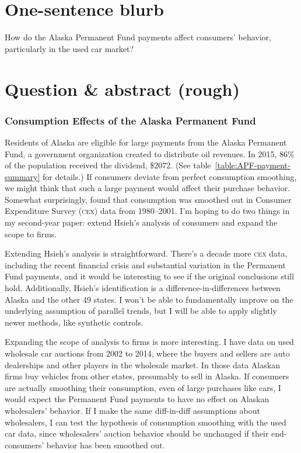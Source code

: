 \documentclass[11pt,letterpaper,oneside]{article}
\newcommand{\cex}{\textsc{cex}}
\begin{document}
	
	
\part{One-sentence blurb}
How do the Alaska Permanent Fund payments affect consumers' behavior, particularly in the used car market?


\part{Question \& abstract (rough)}
\section{Consumption Effects of the Alaska Permanent Fund}
\noindent Residents of Alaska are eligible for large payments from the Alaska Permanent Fund, a government organization created to distribute oil revenues.
In 2015, 86\% of the population received the dividend, \$2072. (See table~\ref{table:APF-payment-summary} for details.)
If consumers deviate from perfect consumption smoothing, we might think that such a large payment would affect their purchase behavior.
Somewhat surprisingly, \textcite{hsieh2003} found that consumption was smoothed out in Consumer Expenditure Survey (\cex) data from 1980--2001.
I'm hoping to do two things in my second-year paper: extend Hsieh's analysis of consumers and expand the scope to firms.

Extending Hsieh's analysis is straightforward.
There's a decade more \cex{} data, including the recent financial crisis and substantial variation in the Permanent Fund payments, and it would be interesting to see if the original conclusions still hold.
Additionally, Hsieh's identification is a difference-in-differences between Alaska and the other 49 states.
I won't be able to fundamentally improve  %
on the underlying assumption of parallel trends, but I will be able to apply slightly newer methods, like synthetic controls. 

Expanding the scope of analysis to firms is more interesting.
I have data on used wholesale car auctions from 2002 to 2014, where the buyers and sellers are auto dealerships and other players in the wholesale market.
In those data Alaskan firms buy vehicles from other states, presumably to sell in Alaska.
If consumers are actually smoothing their consumption, even of large purchases like cars, I would expect the Permanent Fund payments to have no effect on Alaskan wholesalers' behavior.  
If I make the same diff-in-diff assumptions about wholesalers, I can test the hypothesis of consumption smoothing with the used car data, since wholesalers' auction behavior should be unchanged if their end-consumers' behavior has been smoothed out.
\end{document}
